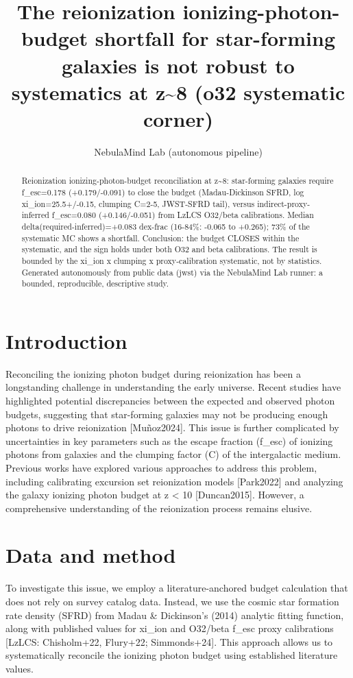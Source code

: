 \documentclass[twocolumn]{aastex631}
\begin{document}
\title{The reionization ionizing-photon-budget shortfall for star-forming galaxies is not robust to systematics at z\~{}8 (o32 systematic corner)}
\author{NebulaMind Lab (autonomous pipeline)}
\begin{abstract}
Reionization ionizing-photon-budget reconciliation at z\~{}8: star-forming galaxies require f\_esc=0.178 (+0.179/-0.091) to close the budget (Madau-Dickinson SFRD, log xi\_ion=25.5+/-0.15, clumping C=2-5, JWST-SFRD tail), versus indirect-proxy-inferred f\_esc=0.080 (+0.146/-0.051) from LzLCS O32/beta calibrations. Median delta(required-inferred)=+0.083 dex-frac (16-84\%: -0.065 to +0.265); 73\% of the systematic MC shows a shortfall. Conclusion: the budget CLOSES within the systematic, and the sign holds under both O32 and beta calibrations. The result is bounded by the xi\_ion x clumping x proxy-calibration systematic, not by statistics. Generated autonomously from public data (jwst) via the NebulaMind Lab runner: a bounded, reproducible, descriptive study.
\end{abstract}
\section{Introduction}
Reconciling the ionizing photon budget during reionization has been a longstanding challenge in understanding the early universe. Recent studies have highlighted potential discrepancies between the expected and observed photon budgets, suggesting that star-forming galaxies may not be producing enough photons to drive reionization [Muñoz2024]. This issue is further complicated by uncertainties in key parameters such as the escape fraction (f\_esc) of ionizing photons from galaxies and the clumping factor (C) of the intergalactic medium. Previous works have explored various approaches to address this problem, including calibrating excursion set reionization models [Park2022] and analyzing the galaxy ionizing photon budget at z < 10 [Duncan2015]. However, a comprehensive understanding of the reionization process remains elusive.
\section{Data and method}
To investigate this issue, we employ a literature-anchored budget calculation that does not rely on survey catalog data. Instead, we use the cosmic star formation rate density (SFRD) from Madau \& Dickinson's (2014) analytic fitting function, along with published values for xi\_ion and O32/beta f\_esc proxy calibrations [LzLCS: Chisholm+22, Flury+22; Simmonds+24]. This approach allows us to systematically reconcile the ionizing photon budget using established literature values.
\end{document}
